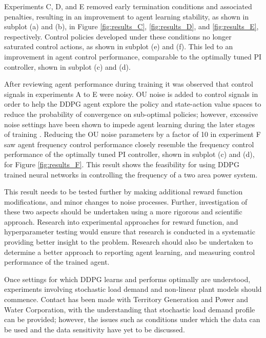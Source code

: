 Experiments C, D, and E removed early termination conditions and associated penalties, resulting in an improvement to agent learning stability, as shown in subplot (a) and (b), in Figure \ref{fig:results_C}, \ref{fig:results_D}, and \ref{fig:results_E}, respectively. Control policies developed under these conditions no longer saturated control actions, as shown in subplot (e) and (f). This led to an improvement in agent control performance, comparable to the optimally tuned PI controller, shown in subplot (c) and (d).

After reviewing agent performance during training it was observed that control signals in experiments A to E were noisy. OU noise is added to control signals in order to help the DDPG agent explore the policy and state-action value spaces to reduce the probability of convergence on sub-optimal policies; however, excessive noise settings have been shown to impede agent learning during the later stages of training \cite{}. Reducing the OU noise parameters by a factor of 10 in experiment F saw agent frequency control performance closely resemble the frequency control performance of the optimally tuned PI controller, shown in subplot (c) and (d), for Figure \ref{fig:results_F}. This result shows the feasibility for using DDPG trained neural networks in controlling the frequency of a two area power system.

This result needs to be tested further by making additional reward function modifications, and minor changes to noise processes. Further, investigation of these two aspects should be undertaken using a more rigorous and scientific approach. Research into experimental approaches for reward function, and hyperparameter testing would ensure that research is conducted in a systematic providing better insight to the problem. Research should also be undertaken to determine a better approach to reporting agent learning, and measuring control performance of the trained agent.

Once settings for which DDPG learns and performs optimally are understood, experiments involving stochastic load demand and non-linear plant models should commence. Contact has been made with Territory Generation and Power and Water Corporation, with the understanding that stochastic load demand profile can be provided; however, the issues such as conditions under which the data can be used and the data sensitivity have yet to be discussed.